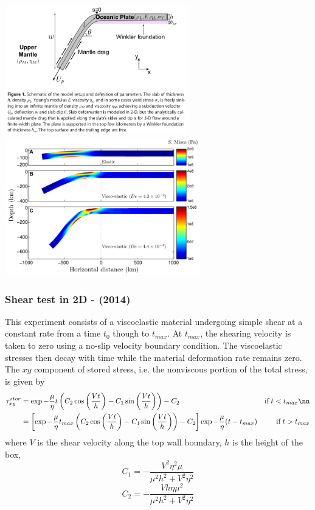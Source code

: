 \begin{center}
\includegraphics[width=8cm]{images/viscoelasticity/fogm14b}
\includegraphics[width=8.5cm]{images/viscoelasticity/fogm14c}\\
\end{center}












\subsubsection{Shear test in 2D - \textcite{famc14} (2014)}

This experiment consists of a viscoelastic material undergoing simple shear at a constant 
rate from a time $t_0$ though to $t_{max}$. At $t_{max}$, the shearing velocity is taken 
to zero using a no-slip velocity boundary condition. The viscoelastic stresses then decay
with time while the material deformation rate remains zero. The $xy$ component of stored 
stress, i.e. the nonviscous portion of the total stress, is given by
\begin{align}
\tau_{xy}^{stor} 
&= 
\exp -\frac{\mu}{\eta}t 
\left(
C_2 \cos\left( \frac{Vt}{h}\right)
-C_1 \sin\left( \frac{Vt}{h}\right)
\right)
-C_2 & \textrm{if} \; t<t_{max} \nn\\
&= \left[\exp -\frac{\mu}{\eta}t_{max} 
\left(
C_2 \cos\left( \frac{Vt}{h}\right)
-C_1 \sin\left( \frac{Vt}{h}\right)
\right)
-C_2 \right] \exp -\frac{\mu}{\eta}(t-t_{max})
& \textrm{if} \; t>t_{max} 
\end{align}
where $V$ is the shear velocity along the top wall boundary, 
$h$ is the height of the box,
\[
C_1=-\frac{V^2 \eta^2 \mu}{\mu^2 h^2 + V^2 \eta^2}
\]
\[
C_2=-\frac{Vh\eta \mu^2}{\mu^2 h^2 + V^2 \eta^2}
\]



